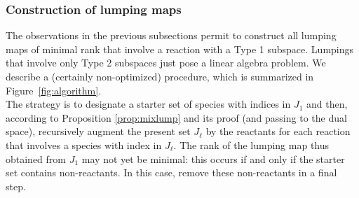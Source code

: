 \documentclass{article}
\begin{document}
\subsubsection{Construction of lumping maps}\label{sec:genconstr}
The observations in the previous subsections permit to construct all lumping maps of minimal rank that involve a reaction with a Type 1 subspace. Lumpings that involve only Type 2 subspaces just pose a linear algebra problem. We describe a (certainly non-optimized) procedure, which is summarized in 
Figure~\ref{fig:algorithm}.\\
The strategy is to designate a starter set of species with indices in $J_1$ and then, according to Proposition \ref{prop:mixlump} and its proof (and passing to the dual space), recursively augment the present set $J_\ell$ by the reactants for each reaction that involves a species with index in $J_\ell$. The rank of the lumping map thus obtained from $J_1$ may not yet be minimal: this occurs if and only if the starter set contains non-reactants. In this case, remove these non-reactants in a final step.
\end{document}
